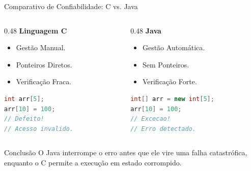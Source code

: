 \documentclass[9pt]{beamer}
\begin{document}
\begin{frame}[fragile]{Comparativo de Confiabilidade: C vs. Java}
    \begin{columns}[T] %
        \begin{column}{0.48\textwidth}
            \textbf{\textcolor{mRed}{Linguagem C}}
            \begin{itemize}
                \item Gestão Manual.
                \item Ponteiros Diretos.
                \item Verificação Fraca.
            \end{itemize}
            \begin{lstlisting}[language=C, basicstyle=\ttfamily\small, xleftmargin=-5pt]
int arr[5];
arr[10] = 100; 
// Defeito! 
// Acesso invalido.
            \end{lstlisting}
        \end{column}

        \begin{column}{0.48\textwidth}
            \textbf{\textcolor{mGreen}{Java}}
            \begin{itemize}
                \item Gestão Automática.
                \item Sem Ponteiros.
                \item Verificação Forte.
            \end{itemize}
            \begin{lstlisting}[language=Java, basicstyle=\ttfamily\small, xleftmargin=-5pt]
int[] arr = new int[5];
arr[10] = 100; 
// Excecao!
// Erro detectado.
            \end{lstlisting}
        \end{column}
    \end{columns}

    \vspace{0.3cm} 
    \begin{block}{Conclusão}
        O Java interrompe o erro antes que ele vire uma falha catastrófica, enquanto o C permite a execução em estado corrompido.
    \end{block}
\end{frame} 
\end{document}
